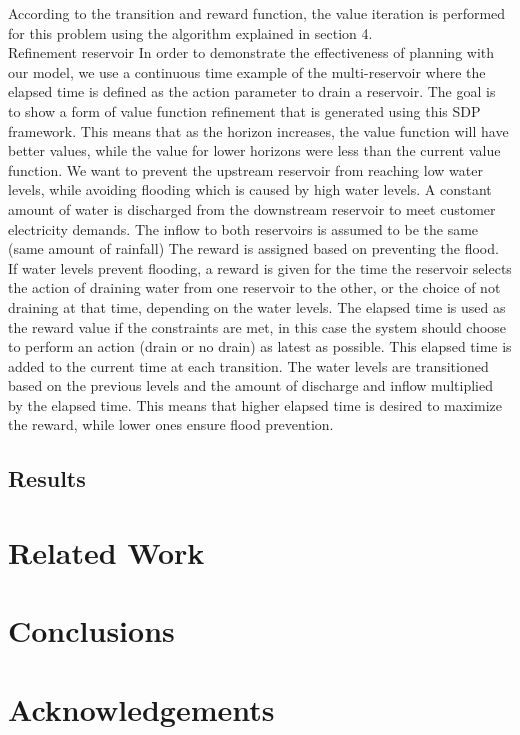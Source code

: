 \documentclass[letterpaper]{article}
\renewcommand{\-}{\text{-}}
\begin{document}
According to the transition and reward function, the value iteration is performed for this problem using the algorithm explained in section 4.
\\
Refinement reservoir
In order to demonstrate the effectiveness of planning with our model, we use a continuous time example of the multi-reservoir where the elapsed time is defined as the action parameter to drain a reservoir. The goal is to show a form of value function refinement that is generated using this SDP framework. This means that as the horizon increases, the value function will have better values, while the value for lower horizons were less than the current value function. 
We want to prevent the upstream reservoir from reaching low water levels, while avoiding flooding which is caused by high water levels. A constant amount of water is discharged from the downstream reservoir to meet customer electricity demands. The inflow to both reservoirs is assumed to be the same (same amount of rainfall) 
The reward is assigned based on preventing the flood. If water levels prevent flooding, a reward is given for the time the reservoir selects the action of draining water from one reservoir to the other, or the choice of not draining at that time, depending on the water levels. The elapsed time is used as the reward value if the constraints are met, in this case the system should choose to perform an action (drain or no drain) as latest as possible. This elapsed time is added to the current time at each transition. The water levels are transitioned based on the previous levels and the amount of discharge and inflow multiplied by the elapsed time. This means that higher elapsed time is desired to maximize the reward, while lower ones ensure flood prevention. 

\subsection{Results}



\section{Related Work}



\section{Conclusions}



\section*{Acknowledgements}





\end{document}
